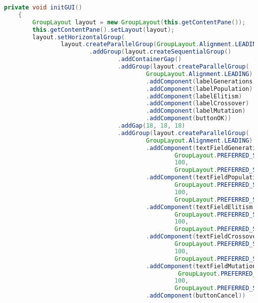 \begin{lstlisting}[language=Java,basicstyle=\tiny,caption=GeneticParameters.java]
    private void initGUI()
    {
        GroupLayout layout = new GroupLayout(this.getContentPane());
        this.getContentPane().setLayout(layout);
        layout.setHorizontalGroup(
                layout.createParallelGroup(GroupLayout.Alignment.LEADING)
                        .addGroup(layout.createSequentialGroup()
                                .addContainerGap()
                                .addGroup(layout.createParallelGroup(
                                        GroupLayout.Alignment.LEADING)
                                        .addComponent(labelGenerations)
                                        .addComponent(labelPopulation)
                                        .addComponent(labelElitism)
                                        .addComponent(labelCrossover)
                                        .addComponent(labelMutation)
                                        .addComponent(buttonOK))
                                .addGap(18, 18, 18)
                                .addGroup(layout.createParallelGroup(
                                        GroupLayout.Alignment.LEADING)
                                        .addComponent(textFieldGenerations, 
                                                GroupLayout.PREFERRED_SIZE, 
                                                100, 
                                                GroupLayout.PREFERRED_SIZE)
                                        .addComponent(textFieldPopulation,
                                                GroupLayout.PREFERRED_SIZE, 
                                                100, 
                                                GroupLayout.PREFERRED_SIZE)
                                        .addComponent(textFieldElitism,
                                                GroupLayout.PREFERRED_SIZE, 
                                                100, 
                                                GroupLayout.PREFERRED_SIZE)
                                        .addComponent(textFieldCrossover,  
                                                GroupLayout.PREFERRED_SIZE, 
                                                100, 
                                                GroupLayout.PREFERRED_SIZE)
                                        .addComponent(textFieldMutation, 
                                                 GroupLayout.PREFERRED_SIZE, 
                                                100, 
                                                GroupLayout.PREFERRED_SIZE)
                                        .addComponent(buttonCancel))

\end{lstlisting}
